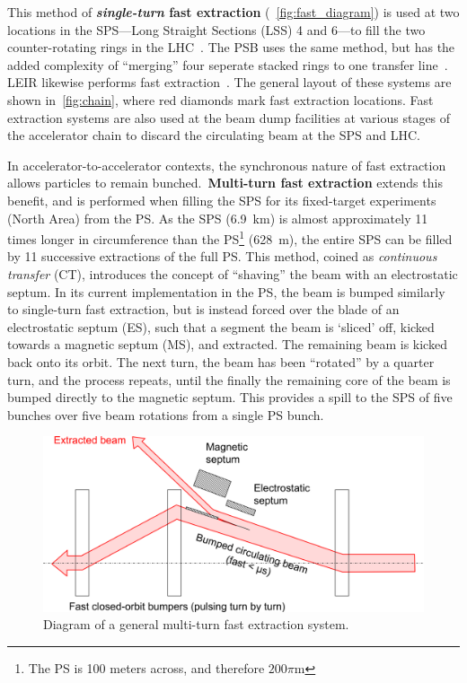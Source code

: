 \documentclass[11pt]{report}
\begin{document}
This method of \textbf{\textit{single-turn} fast extraction} (~\autoref{fig:fast_diagram}) is used at two locations in the SPS---Long Straight Sections (LSS) 4 and 6---to fill the two counter-rotating rings in the LHC~\cite{Fraser:CAS}. The PSB uses the same method, but has the added complexity of ``merging'' four seperate stacked rings to one transfer line~\cite{Metzmacher:2061508}. LEIR likewise performs fast extraction~\cite{Ghithan:2017wpd}. The general layout of these systems are shown in~\ref{fig:chain}, where red diamonds mark fast extraction locations. Fast extraction systems are also used at the beam dump facilities at various stages of the accelerator chain to discard the circulating beam at the SPS and LHC.

In accelerator-to-accelerator contexts, the synchronous nature of fast extraction allows particles to remain bunched.~\textbf{Multi-turn fast extraction} extends this benefit, and is performed when filling the SPS for its fixed-target experiments (North Area) from the PS. As the SPS (\qty{6.9}{km}) is almost approximately 11 times longer in circumference than the PS\footnote{The PS is 100 meters across, and therefore $200\pi$\si{m}} (\qty{628}{m}), the entire SPS can be filled by 11 successive extractions of the full PS. This method, coined as \textit{continuous transfer} (CT), introduces the concept of ``shaving'' the beam with an electrostatic septum. In its current implementation in the PS, the beam is bumped similarly to single-turn fast extraction, but is instead forced over the blade of an electrostatic septum (ES), such that a segment the beam is `sliced' off, kicked towards a magnetic septum (MS), and extracted. The remaining beam is kicked back onto its orbit. The next turn, the beam has been ``rotated'' by a quarter turn, and the process repeats, until the finally the remaining core of the beam is bumped directly to the magnetic septum. This provides a spill to the SPS of five bunches over five beam rotations from a single PS bunch.

\begin{figure}[hb]
  \centering
  \includegraphics[width=\linewidth]{fastmulti.png}
  \caption{Diagram of a general multi-turn fast extraction system.~\cite{Fraser:CAS}}
  \label{fig:fast_multi_diagram}
\end{figure}
\end{document}
